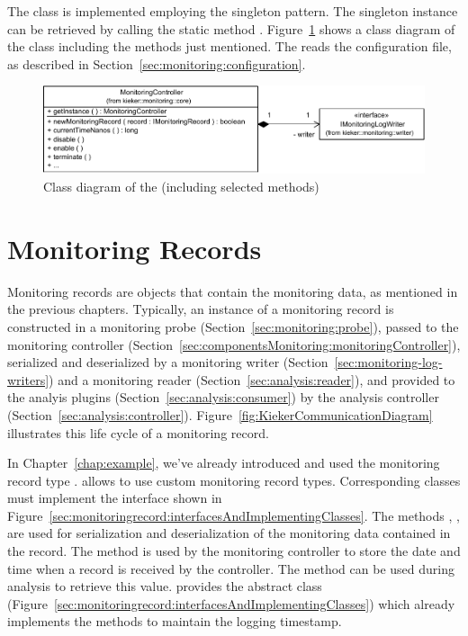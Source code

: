 The class  is implemented employing the singleton pattern. %
The singleton instance %
can be retrieved by calling the static method . %
Figure~\ref{fig:monitoringController:classdiagram} shows %
a class diagram of the class  including the methods 
just mentioned. The  reads the configuration %
file, as described in Section~\ref{sec:monitoring:configuration}.

\begin{figure}[H]\centering
\includegraphics[scale=0.7]{images/kieker_monitoringControlleruserguide-simplified}
\caption{Class diagram of the  (including selected methods)}
\label{fig:monitoringController:classdiagram}
\end{figure}

\section{Monitoring Records}\label{sec:componentsMonitoring:monitoringRecords}

Monitoring records are objects that contain the monitoring data, as mentioned %
in the previous chapters. Typically, an instance of a monitoring record is %
constructed in a monitoring probe (Section~\ref{sec:monitoring:probe}), %
passed to the monitoring controller (Section~\ref{sec:componentsMonitoring:monitoringController}), %
serialized and deserialized by a monitoring %
writer (Section~\ref{sec:monitoring-log-writers}) and a
monitoring reader (Section~\ref{sec:analysis:reader}), and provided to the %
analyis plugins (Section~\ref{sec:analysis:consumer}) %
by the analysis controller (Section~\ref{sec:analysis:controller}). %
Figure~\ref{fig:KiekerCommunicationDiagram} illustrates this life cycle of a monitoring %
record. %

In Chapter~\ref{chap:example}, we've already introduced and used the monitoring %
record type . \Kieker{} allows to use custom %
monitoring record types. Corresponding classes must implement the %
interface  shown in Figure~\ref{sec:monitoringrecord:interfacesAndImplementingClasses}. %
The methods , ,  %
are used for serialization and deserialization of the monitoring data contained %
in the record. The method  is used by the monitoring controller to %
store the date and time when a record is received by the controller. %
The method  can be used during analysis to retrieve %
this value. \KiekerMonitoringPart{} provides the abstract class %
 (Figure~\ref{sec:monitoringrecord:interfacesAndImplementingClasses}) %
which already implements the methods to maintain the logging timestamp. 


